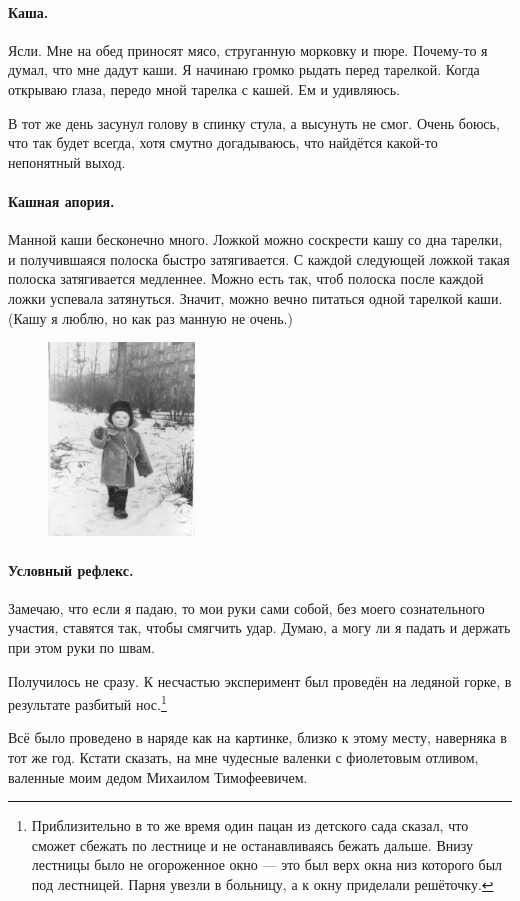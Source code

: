 \documentclass{book}
\begin{document}
\paragraph{Каша.}
Ясли.
Мне на обед приносят мясо, струганную морковку и пюре.
Почему-то я думал, что мне дадут каши.
Я начинаю громко рыдать перед тарелкой. 
Когда открываю глаза, передо мной тарелка с кашей.
Ем и удивляюсь.

В тот же день засунул голову в спинку стула, а высунуть не смог.
Очень боюсь, что так будет всегда, хотя смутно догадываюсь, что найдётся какой-то непонятный выход.

\paragraph{Кашная апория.}
Манной каши бесконечно много.
Ложкой можно соскрести кашу со дна тарелки,
и получившаяся полоска быстро затягивается.
С каждой следующей ложкой такая полоска затягивается медленнее.
Можно есть так, чтоб полоска после каждой ложки успевала затянуться.
Значит, можно вечно питаться одной тарелкой каши.
(Кашу я люблю, но как раз манную не очень.)

{

\begin{figure}
\vskip-4mm
\centering
\includegraphics[width=39mm,angle=0]{pics/tosha-detsad-crop}
\end{figure}

\paragraph{Условный рефлекс.}
Замечаю, что если я падаю, то мои руки сами собой, без моего сознательного участия, ставятся так, чтобы смягчить удар.
Думаю, а могу ли я падать и держать при этом руки по швам.

Получилось не сразу.
К несчастью эксперимент был проведён на ледяной горке, в результате разбитый нос.\footnote{Приблизительно в то же время один пацан из детского сада сказал, что сможет сбежать по лестнице и не останавливаясь бежать дальше.
Внизу лестницы было не огороженное окно --- это был верх окна низ которого был под лестницей.
Парня увезли в больницу, а к окну приделали решёточку.}

Всё было проведено в наряде как на картинке, близко к этому месту, наверняка в тот же год.
Кстати сказать, на мне чудесные валенки с фиолетовым отливом, валенные моим дедом Михаилом Тимофеевичем.

}
\end{document}
